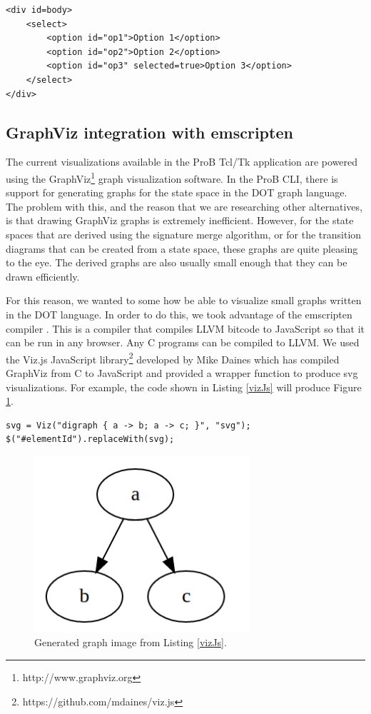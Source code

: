 \lstset{language=HTML}
\begin{lstlisting}[caption=Html generated from Listing \ref{d3Example},label=d3Result]
<div id=body>
    <select>
        <option id="op1">Option 1</option>
        <option id="op2">Option 2</option>
        <option id="op3" selected=true>Option 3</option>
    </select>
</div>
\end{lstlisting}


\subsection{GraphViz integration with emscripten}

The current visualizations available in the ProB Tcl/Tk application are powered using the GraphViz\footnote{http://www.graphviz.org} graph visualization software. In the ProB CLI, there is support for generating graphs for the state space in the DOT graph language. The problem with this, and the reason that we are researching other alternatives, is that drawing GraphViz graphs is extremely inefficient. However, for the state spaces that are derived using the signature merge algorithm, or for the transition diagrams that can be created from a state space, these graphs are quite pleasing to the eye. The derived graphs are also usually small enough that they can be drawn efficiently.

For this reason, we wanted to some how be able to visualize small graphs written in the DOT language. In order to do this, we took advantage of the emscripten compiler \cite{emscripten}. This is a compiler that compiles LLVM bitcode to JavaScript so that it can be run in any browser. Any C programs can be compiled to LLVM. We used the Viz.js JavaScript library\footnote{https://github.com/mdaines/viz.js} developed by Mike Daines which has compiled GraphViz from C to JavaScript and provided a wrapper function to produce svg visualizations. For example, the code shown in Listing \ref{vizJs} will produce Figure \ref{graphVizEx}.

\begin{lstlisting}[caption=Create a visualization with viz.js and insert it into an html page.,label=vizJs]
svg = Viz("digraph { a -> b; a -> c; }", "svg");
$("#elementId").replaceWith(svg);
\end{lstlisting}

\begin{center}
\begin{figure}[h!]
\centering
\includegraphics[width=8cm]{bilder/graphVizExample.png}
\caption{Generated graph image from Listing \ref{vizJs}.}
\label{graphVizEx}
\end{figure}
\end{center}